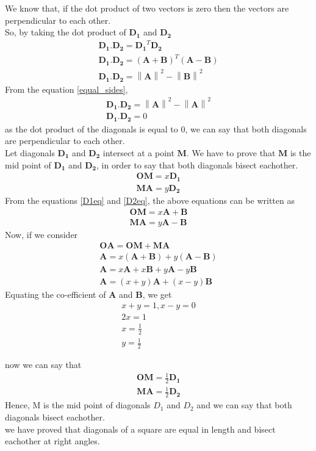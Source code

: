 \documentclass[journal,12pt,twocolumn]{article}
\providecommand{\norm}[1]{\left\lVert#1\right\rVert}
\begin{document}
We know that, if the dot product of two vectors is zero then the vectors are perpendicular to each other. \\
So, by taking the dot product of $\boldsymbol{D_1}$ and $\boldsymbol{D_2}$ 
\begin{align}
	\boldsymbol{D_1.D_2} = \boldsymbol{D_1}^T \boldsymbol{D_2} \\
	\boldsymbol{D_1.D_2} = (\boldsymbol{A + B})^T(\boldsymbol{A - B})\\
	\boldsymbol{D_1.D_2} = \norm{\boldsymbol{A}}^2 - \norm{\boldsymbol{B}}^2
\end{align}	
From the equation \eqref{equal_sides}, 
\begin{align}
	\boldsymbol{D_1.D_2} = \norm{\boldsymbol{A}}^2 - \norm{\boldsymbol{A}}^2 \\
	\boldsymbol{D_1.D_2} = 0 
\end{align}	
as the dot product of the diagonals is equal to 0, we can say that both diagonals are perpendicular to each other. \\

Let diagonals $\boldsymbol{D_1}$ and $\boldsymbol{D_2}$ intersect at a point $\boldsymbol{M}$. We have to prove that $\boldsymbol{M}$ is the mid point of $\boldsymbol{D_1}$ and $\boldsymbol{D_2}$, in order to say that both diagonals bisect eachother.
\begin{align}
	\boldsymbol{OM} = x \boldsymbol{D_1}\\
	\boldsymbol{MA} = y \boldsymbol{D_2}
\end{align}
From the equations \eqref{D1eq} and \eqref{D2eq}, the above equations can be written as
\begin{align}
	\boldsymbol{OM} = x\boldsymbol{A + B}\\
	\boldsymbol{MA} = y\boldsymbol{A - B}
\end{align}
Now, if we consider
\begin{align}
	\boldsymbol{OA} = \boldsymbol{OM} + \boldsymbol{MA}\\
	\boldsymbol{A} = x(\boldsymbol{A+B}) + y(\boldsymbol{A-B})\\
	\boldsymbol{A} = x\boldsymbol{A} + x\boldsymbol{B} + y\boldsymbol{A} - y\boldsymbol{B}\\
	\boldsymbol{A} = (x+y)\boldsymbol{A} + (x-y)\boldsymbol{B}
\end{align}
Equating the co-efficient of $\boldsymbol{A}$ and $\boldsymbol{B}$, we get
\begin{align}
	x + y = 1 , x - y = 0\\
	2x = 1\\
	x = \frac{1}{2}\\
	y = \frac{1}{2}
\end{align}

now we can say that
\begin{align}
	\boldsymbol{OM} = \frac{1}{2} \boldsymbol{D_1}\\
	\boldsymbol{MA} = \frac{1}{2} \boldsymbol{D_2}
\end{align}
Hence, M is the mid point of diagonals $D_1$ and $D_2$ and we can say that both diagonals bisect eachother. \\

we have proved that diagonals of a square are equal in length and bisect eachother at right angles.
\end{document}
